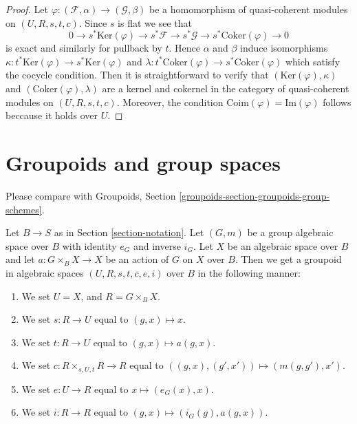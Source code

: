 \begin{proof}
Let $\varphi : (\mathcal{F}, \alpha) \to (\mathcal{G}, \beta)$ be a
homomorphism of quasi-coherent modules on $(U, R, s, t, c)$. Since $s$ is flat
we see that
$$
0 \to s^*\text{Ker}(\varphi)
\to s^*\mathcal{F} \to s^*\mathcal{G} \to s^*\text{Coker}(\varphi) \to 0
$$
is exact and similarly for pullback by $t$. Hence $\alpha$ and $\beta$
induce isomorphisms
$\kappa : t^*\text{Ker}(\varphi) \to s^*\text{Ker}(\varphi)$ and
$\lambda : t^*\text{Coker}(\varphi) \to s^*\text{Coker}(\varphi)$
which satisfy the cocycle condition. Then it is straightforward to
verify that $(\text{Ker}(\varphi), \kappa)$ and
$(\text{Coker}(\varphi), \lambda)$ are a kernel and cokernel in the
category of quasi-coherent modules on $(U, R, s, t, c)$. Moreover,
the condition $\text{Coim}(\varphi) = \text{Im}(\varphi)$ follows
beccause it holds over $U$.
\end{proof}





\section{Groupoids and group spaces}
\label{section-groupoids-group-spaces}

\noindent
Please compare with
Groupoids, Section \ref{groupoids-section-groupoids-group-schemes}.

\begin{lemma}
\label{lemma-groupoid-from-action}
Let $B \to S$ as in Section \ref{section-notation}.
Let $(G, m)$ be a group algebraic space over $B$ with
identity $e_G$ and inverse $i_G$.
Let $X$ be an algebraic space over $B$ and let $a : G \times_B X \to X$
be an action of $G$ on $X$ over $B$.
Then we get a groupoid in algebraic spaces $(U, R, s, t, c, e, i)$ over $B$
in the following manner:
\begin{enumerate}
\item We set $U = X$, and $R = G \times_B X$.
\item We set $s : R \to U$ equal to $(g, x) \mapsto x$.
\item We set $t : R \to U$ equal to $(g, x) \mapsto a(g, x)$.
\item We set $c : R \times_{s, U, t} R \to R$ equal to
$((g, x), (g', x')) \mapsto (m(g, g'), x')$.
\item We set $e : U \to R$ equal to $x \mapsto (e_G(x), x)$.
\item We set $i : R \to R$ equal to $(g, x) \mapsto (i_G(g), a(g, x))$.
\end{enumerate}
\end{lemma}

